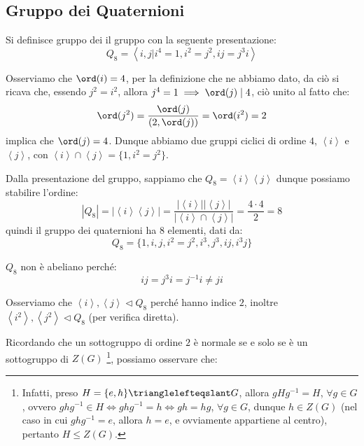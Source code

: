 \documentclass[11pt]{scrartcl}
\begin{document}
\newpage
\subsection{Gruppo dei Quaternioni}

\begin{definition}
    Si definisce gruppo dei  il gruppo con la seguente presentazione:
        \[ Q_8 = \left<i,j | i^4 = 1, i^2 = j^2, ij = j^3i\right>
            \]
\end{definition}

\begin{remark}[Ordini di $i$ e $j$]
    Osserviamo che $\ord(i) = 4$, per la definizione che ne abbiamo dato, da ciò si ricava che, essendo $j^2 = i^2$,
    allora $j^4 = 1 \implies \ord(j) \mid 4$, ciò unito al fatto che:
        \[ \ord(j^2) = \frac{\ord(j)}{(2,\ord(j))} = \ord(i^2) = 2
            \]
    implica che $\ord(j) = 4$. Dunque abbiamo due gruppi ciclici di ordine $4$, $\left<i\right>$ e $\left<j\right>$, con
    $\left<i\right> \cap \left<j\right> = \{1,i^2 = j^2\}$.
\end{remark}

Dalla presentazione del gruppo, sappiamo che $Q_8 = \left<i\right>\left<j\right>$ dunque possiamo stabilire l'ordine:
    \[ |Q_8| = |\left<i\right>\left<j\right>| = \frac{|\left<i\right>||\left<j\right>|}{|\left<i\right> \cap \left<j\right>|} = \frac{4 \cdot 4 }{2} = 8
        \]
quindi il gruppo dei quaternioni ha $8$ elementi, dati da:
    \[ Q_8 = \{1, i, j, i^2 = j^2, i^3, j^3, ij, i^3j\}
        \]

\begin{remark}
    $Q_8$ non è abeliano perché:
        \[ ij = j^3i = j^{-1}i \ne ji
            \]
\end{remark}

\begin{remark}
    Osserviamo che $\left<i\right>,\left<j\right> \triangleleft Q_8$ perché hanno indice $2$, inoltre $\left<i^2\right>, \left<j^2\right> \triangleleft Q_8$ (per verifica diretta). 
\end{remark}

Ricordando che un sottogruppo di ordine $2$ è normale se e solo se è un sottogruppo di $Z(G)$ \footnote{Infatti, preso $H = \{e,h\} \trianglelefteqslant G$, allora $gHg^{-1} = H$, $\forall g \in G$, ovvero $ghg^{-1} \in H \iff ghg^{-1} = h \iff
gh = hg$, $\forall g \in G$, dunque $h \in Z(G)$ (nel caso in cui $ghg^{-1} = e$, allora $h = e$, e ovviamente appartiene al centro), pertanto $H \leqslant Z(G)$.}, possiamo osservare che:
\end{document}
